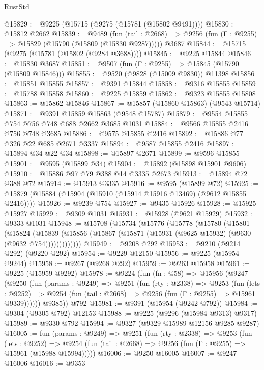 \begin{lexlean}{RustStd}
\begin{coremodule}
@15829 := @9225 (@15715 (@9275 (@15781 (@15802 @9491))))
@15830 := @15812 @2662
@15839 := @9489
    (fun (tail : @2668) => @9256 (fun (Γ : @9255) => @15829 (@15790 (@15809 (@15830 @9287)))))
    @3687
@15844 := @15715 (@9275 (@15781 (@15802 (@9284 @3688))))
@15845 := @9225 @15844
@15846 := @15830 @3687
@15851 := @9507 (fun (Γ : @9255) => @15845 (@15790 (@15809 @15846)))
@15855 := @9520 (@9828 (@15009 @9830)) @11398
@15856 := @15851 @15855
@15857 := @9391 @15844
@15858 := @9316 @15855
@15859 := @15788 @15858
@15860 := @9225 @15859
@15862 := @9323 @15855 @15808
@15863 := @15862 @15846
@15867 := @15857 (@15860 @15863) (@9543 @15714)
@15871 := @9391 @15859 @15863 (@9548 @15787)
@15879 := @9554 @15855 @754 @756 @748 @688 @2662 @3685 @1031
@15884 := @9566 @15855 @2416 @756 @748 @3685
@15886 := @9575 @15855 @2416
@15892 := @15886 @77 @326 @22 @685 @2671 @3337
@15894 := @9587 @15855 @2416
@15897 := @15894 @34 @22 @34
@15898 := @15897 @2671
@15899 := @9596 @15855
@15901 := @9595 (@15899 @34)
@15904 := @15892 (@15898 @15901 @9606)
@15910 := @15886 @97 @79 @388 @14 @3335 @2673
@15913 := @15894 @72 @388 @72
@15914 := @15913 @3335
@15916 := @9595 (@15899 @72)
@15925 := @15879 (@15884 (@15904 (@15910 (@15914 @15916 @13469) (@9612 @15855 @2416))))
@15926 := @9239 @754
@15927 := @9435 @15926
@15928 := @15925 @15927
@15929 := @9309 @1031
@15931 := @15928 (@9621 @15929)
@15932 := @9333 @1031
@15948 := @15708
    (@15734
      (@15776
        (@15778
          (@15780
            (@15801
              (@15824
                (@15839
                  (@15856 (@15867 (@15871 (@15931 (@9625 @15932) (@9630 (@9632 @754)))))))))))))
@15949 := @9208 @292
@15953 := @9210 (@9214 @292) (@9220 @292)
@15954 := @9229 @12150
@15956 := @9225 (@15954 @9244)
@15958 := @9267 (@9268 @292)
@15959 := @9263 @15958
@15961 := @9225 (@15959 @9292)
@15978 := @9224
    (fun (fn : @58) =>
    @15956
      (@9247
        (@9250
          (fun (params : @9249) =>
          @9251
            (fun (rty : @2338) =>
            @9253
              (fun (lets : @9252) =>
              @9254 (fun (tail : @2668) => @9256 (fun (Γ : @9255) => @15961 @9339))))))
        @9385))
    @792
@15981 := @9391 (@15954 (@9242 @792))
@15984 := @9304 (@9305 @792) @12153
@15988 := @9225 (@9296 (@15984 @9313) @9317)
@15989 := @9330 @792
@15994 := @9327 (@9329 @15989 @12156 @9285 @9287)
@16005 := fun (params : @9249) =>
  @9251
    (fun (rty : @2338) =>
    @9253
      (fun (lets : @9252) =>
      @9254 (fun (tail : @2668) => @9256 (fun (Γ : @9255) => @15961 (@15988 @15994)))))
@16006 := @9250 @16005
@16007 := @9247 @16006
@16016 := @9353

\end{coremodule}
\end{lexlean}
